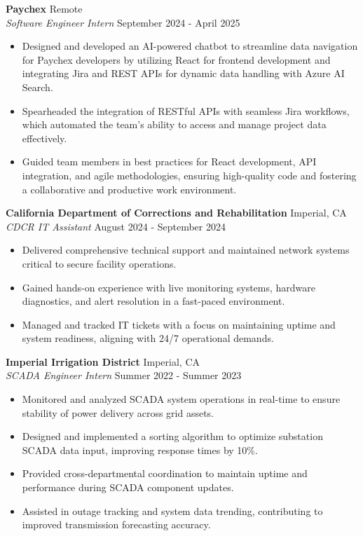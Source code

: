 \documentclass[a4paper]{article}
\begin{document}
\textbf{Paychex} \hfill Remote\\
\textit{Software Engineer Intern} \hfill September 2024 - April 2025 
\vspace{-1mm}
\begin{itemize} \itemsep 1pt
	\item Designed and developed an AI-powered chatbot to streamline data navigation for Paychex developers by utilizing React for frontend development and integrating Jira and REST APIs for dynamic data handling with Azure AI Search.
	\item Spearheaded the integration of RESTful APIs with seamless Jira workflows, which automated the team’s ability to access and manage project data effectively.
	\item Guided team members in best practices for React development, API integration, and agile methodologies, ensuring high-quality code and fostering a collaborative and productive work environment.
\end{itemize}
\textbf{California Department of Corrections and Rehabilitation} \hfill Imperial, CA\\
\textit{CDCR IT Assistant} \hfill August 2024 - September 2024\\
\vspace{-1mm}
\begin{itemize} \itemsep 1pt
    \item Delivered comprehensive technical support and maintained network systems critical to secure facility operations.
    \item Gained hands-on experience with live monitoring systems, hardware diagnostics, and alert resolution in a fast-paced environment.
    \item Managed and tracked IT tickets with a focus on maintaining uptime and system readiness, aligning with 24/7 operational demands.
\end{itemize}
\textbf{Imperial Irrigation District} \hfill Imperial, CA\\
\textit{SCADA Engineer Intern} \hfill Summer 2022 - Summer 2023\\
\vspace{-1mm}
\begin{itemize} \itemsep 1pt
    \item Monitored and analyzed SCADA system operations in real-time to ensure stability of power delivery across grid assets.
    \item Designed and implemented a sorting algorithm to optimize substation SCADA data input, improving response times by 10\%.
    \item Provided cross-departmental coordination to maintain uptime and performance during SCADA component updates.
    \item Assisted in outage tracking and system data trending, contributing to improved transmission forecasting accuracy.
\end{itemize}
\end{document}
